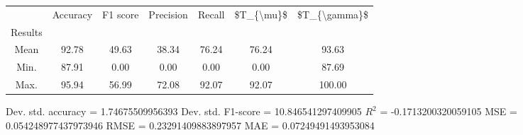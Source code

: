 \begin{tabular}{|c|c|c|c|c|c|c|}
\toprule
{} &  Accuracy &  F1 score &  Precision &  Recall &  \$T\_\{\textbackslash mu\}\$ &  \$T\_\{\textbackslash gamma\}\$ \\
Results &           &           &            &         &            &               \\
\hline
Mean    &     92.78 &     49.63 &      38.34 &   76.24 &      76.24 &         93.63 \\
Min.    &     87.91 &      0.00 &       0.00 &    0.00 &       0.00 &         87.69 \\
Max.    &     95.94 &     56.99 &      72.08 &   92.07 &      92.07 &        100.00 \\
\bottomrule
\end{tabular}

 Dev. std. accuracy = 1.74675509956393
 Dev. std. F1-score = 10.846541297409905
 $R^2$ = -0.1713200320059105
 MSE = 0.054248977437973946
 RMSE = 0.23291409883897957
 MAE = 0.07249491493953084